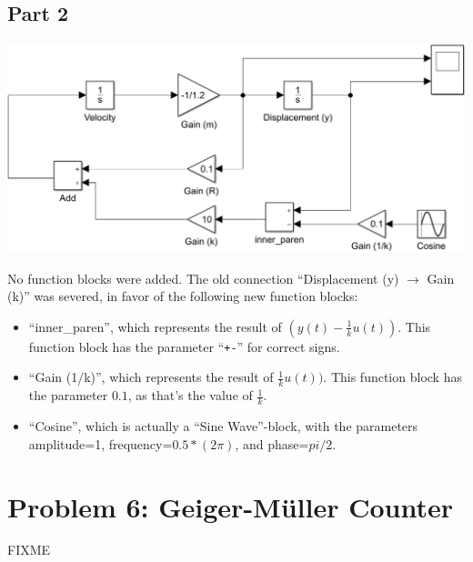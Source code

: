 \documentclass[a4paper,parskip,headheight=38pt]{scrartcl} %
\begin{document}
\subsection*{Part 2}

\includegraphics[width=\textwidth]{p5b-model}

No function blocks were added.  The old connection
\enquote{Displacement (y) $\rightarrow$ Gain (k)} was severed, in favor
of the following new function blocks:
\begin{itemize}
    \item \enquote{inner\_paren}, which represents the result of $(y(t)
    - \frac{1}{k}u(t))$.  This function block has the parameter
    \enquote{\texttt{+-}} for correct signs.
    \item \enquote{Gain (1/k)}, which represents the result of
    $\frac{1}{k}u(t))$.  This function block has the parameter $0.1$,
    as that's the value of $\frac{1}{k}$.
    \item \enquote{Cosine}, which is actually a \enquote{Sine
    Wave}-block, with the parameters amplitude=1,
    frequency=$0.5*(2\pi)$, and phase=$pi/2$.
\end{itemize}


\section*{Problem 6: Geiger-Müller Counter}

FIXME
\end{document}
